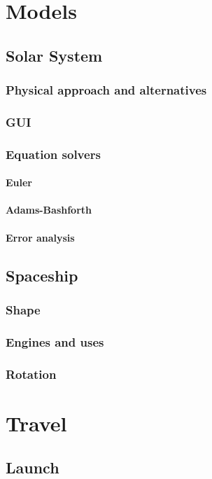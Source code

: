 \documentclass[10pt,a4paper]{article}
\begin{document}
	\section{Models}

	\subsection{Solar System}
	\subsubsection{Physical approach and alternatives}
	\subsubsection{GUI}
	\subsubsection{Equation solvers}
	\paragraph{Euler}
	\paragraph{Adams-Bashforth}
	\paragraph{Error analysis}	

	\subsection{Spaceship}
	\subsubsection{Shape}
	\subsubsection{Engines and uses}
	\subsubsection{Rotation}
	
	\section{Travel}
	\subsection{Launch}
\end{document}
